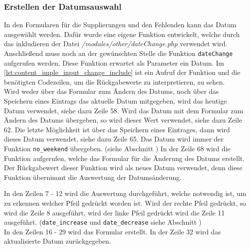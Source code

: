 \subsubsection{Erstellen der Datumsauswahl}
In den Formularen für die Supplierungen und den Fehlenden kann das Datum ausgewählt werden. Dafür wurde eine eigene Funktion entwickelt, welche durch das inkludieren der Datei \textit{/modules/other/dateChange.php} verwendet wird. Anschließend muss noch an der gewünschten Stelle die Funktion \texttt{dateChange} aufgerufen werden. Diese Funktion erwartet als Parameter ein Datum. Im \autoref{lst:content_imple_input_change_include} ist ein Aufruf der Funktion und die benötigten Codezeilen, um die Rückgabewerte zu interpretieren, zu sehen.\\
Wird weder über das Formular zum Ändern des Datums, noch über das Speichern eines Eintrags das aktuelle Datum mitgegeben, wird das heutige Datum verwendet, siehe dazu Zeile 58. Wird das Datum mit dem Formular zum Ändern des Datums übergeben, so wird dieser Wert verwendet, siehe dazu Zeile 62. Die letzte Möglichkeit ist über das Speichern eines Eintrages, dann wird dieses Datum verwendet, siehe dazu Zeile 65. Das Datum wird immer der Funktion \texttt{no\_weekend} übergeben. (siehe Abschnitt ) In der Zeile 68 wird die Funktion aufgerufen, welche das Formular für die Änderung des Datums erstellt. Der Rückgabewert dieser Funktion wird als neues Datum verwendet, denn diese Funktion übernimmt die Auswertung der Datumsänderung. 



In den Zeilen 7 - 12 wird die Auswertung durchgeführt, welche notwendig ist, um zu erkennen welcher Pfeil gedrückt worden ist. Wird der rechte Pfeil gedrückt, so wird die Zeile 8 ausgeführt, wird der linke Pfeil gedrückt wird die Zeile 11 ausgeführt. (\texttt{date\_increase} und \texttt{date\_decrease} siehe Abschnitt )\\
In den Zeilen 16 - 29 wird das Formular erstellt. In der Zeile 32 wird das aktualisierte Datum zurückgegeben.



